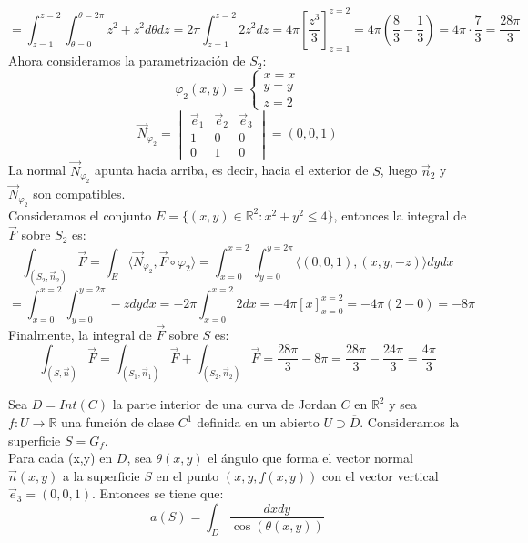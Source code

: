 {    $$ = \int_{z=1}^{z=2} \int_{\theta = 0}^{\theta = 2\pi} z^2 + z^2 d\theta dz = 2 \pi \int_{z=1}^{z=2} 2z^2 dz = 4 \pi \left[ \frac{z^3}{3} \right]_{z=1}^{z=2} = 4 \pi \left( \frac{8}{3} - \frac{1}{3} \right) = 4 \pi \cdot \frac{7}{3} = \frac{28\pi}{3}$$
    Ahora consideramos la parametrización de $S_2$:
    $$ \varphi_2 (x,y) = \begin{cases}
        x = x\\
        y = y\\
        z = 2
        \end{cases}$$
    $$ \vec{N}_{\varphi_2} =
        \begin{vmatrix}
            \vec{e}_1 & \vec{e}_2 & \vec{e}_3 \\
            1 & 0 & 0 \\
            0 & 1 & 0
        \end{vmatrix} = (0, 0, 1)$$
    La normal $\vec{N}_{\varphi_2}$ apunta hacia arriba, es decir, hacia el exterior de $S$, luego $\vec{n}_2$ y $\vec{N}_{\varphi_2}$ son compatibles.\\
    Consideramos el conjunto $E = \{(x,y) \in \mathbb{R}^2 : x^2 + y^2 \leq 4\}$, entonces la integral de $\vec{F}$ sobre $S_2$ es:
    $$ \int_{(S_2, \vec{n}_2)} \vec{F} = \int_{E} \langle \vec{N}_{\varphi_2}, \vec{F} \circ \varphi_2 \rangle = \int_{x=0}^{x=2} \int_{y=0}^{y=2\pi} \langle (0, 0, 1), (x, y, -z) \rangle dy dx$$
    $$ = \int_{x=0}^{x=2} \int_{y=0}^{y=2\pi} -z dy dx = -2\pi \int_{x=0}^{x=2} 2 dx = -4\pi \left[ x \right]_{x=0}^{x=2} = -4\pi (2-0) = -8\pi$$
    Finalmente, la integral de $\vec{F}$ sobre $S$ es:
    $$ \int_{(S, \vec{n})} \vec{F} = \int_{(S_1, \vec{n}_1)} \vec{F} + \int_{(S_2, \vec{n}_2)} \vec{F} = \frac{28\pi}{3} - 8\pi = \frac{28\pi}{3} - \frac{24\pi}{3} = \frac{4\pi}{3} $$
    
}


\begin{proposición}
    Sea $D = Int(C)$ la parte interior de una curva de Jordan $C$ en $\mathbb{R}^2$ y sea $f : U \to \mathbb{R}$ una función de clase $C^1$ definida en un abierto $U \supset \overline{D}$. Consideramos la superficie $S = G_f$.\\
    Para cada (x,y) en $D$, sea $\theta(x,y)$ el ángulo que forma el vector normal $\vec{n}(x,y)$ a la superficie $S$ en el punto $(x,y,f(x,y))$ con el vector vertical $\vec{e}_3 = (0,0,1)$. Entonces se tiene que:
    $$ a(S) = \int_{D} \frac{dxdy}{\cos(\theta(x,y))}$$
\end{proposición}

